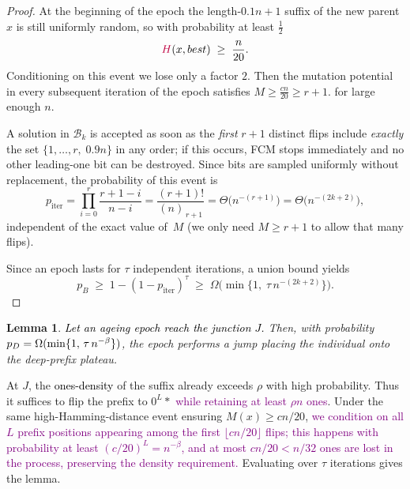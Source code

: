 \documentclass[lettersize,journal]{IEEEtran}
\newcommand{\new}[1]{\textcolor{black}{#1}}
\newcommand{\rerev}[1]{\textcolor{purple}{#1}}
\newtheorem{lemma}{Lemma}
\begin{document}
\begin{proof}
	At the beginning of the epoch the length-\(0.1n+1\) suffix of the new parent \(x\) is still uniformly random,
	so with probability at least \(\tfrac12\)
	\[
	\rerev{H}(x,best)\;\ge\;\frac{n}{20}.
	\]
	Conditioning on this event we lose only a factor \(2\).
	Then the mutation potential in every subsequent
	iteration of the epoch satisfies
	\(
	M\ge \tfrac{cn}{20}  \geq r+1.
	\) for large enough $n$.
	
A solution in $\mathcal{B}_k$ is accepted as soon as the \emph{first} $r{+}1$ distinct flips
	include \emph{exactly} the set
	\(\{1,\dots,r,\;0.9n\}\)
	in any order; if this occurs, FCM stops immediately and no other
	leading-one bit can be destroyed.
Since bits are sampled uniformly without replacement, the probability of
	this event is
	\[
	p_{\text{iter}}
	=\prod_{i=0}^{r}\frac{r+1-i}{n-i}
	=\frac{(r+1)!}{(n)_{\,r+1}}
	=\Theta\!\bigl(n^{-(r+1)}\bigr)
	=\Theta\!\bigl(n^{-(2k+2)}\bigr),
	\]
	independent of the exact value of~$M$ (we only need $M\ge r{+}1$ to allow that
	many flips).
	
Since an epoch lasts for \(\tau\) independent iterations, a union bound yields
	\[
	p_B
	\;\ge\;
	1-(1-p_{\text{iter}})^{\tau}
	\;\ge\;
	\Omega\!\bigl(\min\{1,\;\tau\,n^{-(2k+2)}\}\bigr).
	\]
	
	\noindent
\end{proof}



\begin{lemma} \label{lem:DPO-epoch}
	\textcolor{black}{Let an ageing epoch reach the junction $J$.} Then, with probability $\new{p_D}=\Omega(\min\{1,\,\tau\,n^{-\beta}\})$, the epoch performs a jump placing the individual onto the deep-prefix plateau.
\end{lemma}

At $J$, the \textcolor{black}{ones-density} of the suffix already exceeds $\rho$ with high probability.
Thus it suffices to flip the prefix to $0^L *$ \rerev{while retaining at least $\rho n$ ones}.
Under the same high-Hamming-distance event ensuring $M(x)\ge cn/20$, \rerev{we condition on all $L$ prefix positions appearing among the first $\lfloor cn/20\rfloor$ flips; this happens with probability at least $(c/20)^L = n^{-\beta}$, and at most $cn/20 < n/32$ ones are lost in the process, preserving the density requirement.}
Evaluating over $\tau$ iterations gives the lemma.
\end{document}
